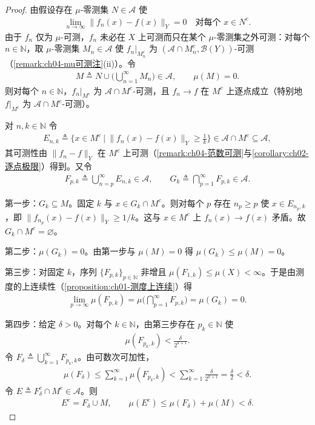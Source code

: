 \documentclass[../../main.tex]{subfiles}%
\begin{document}
\begin{proof}
由假设存在 $\mu$-零测集 $N\in\mathcal{A}$ 使
\begin{align*}
\lim_{n\to\infty}\|f_n(x)-f(x)\|_Y=0\quad\text{对每个 }x\in N^c.
\end{align*}
由于 $f_n$ 仅为 $\mu$-可测，$f_n$ 未必在 $X$ 上可测而只在某个 $\mu$-零测集之外可测：对每个 $n\in\mathbb{N}$，取 $\mu$-零测集 $M_n\in\mathcal{A}$ 使 $f_n|_{M_n^c}$ 为 $(\mathcal{A}\cap M_n^c,\mathcal{B}(Y))$-可测（\cref{remark:ch04-mu可测注}(ii)）。令
\begin{align*}
M\triangleq N\cup\Big(\bigcup_{n=1}^\infty M_n\Big)\in\mathcal{A},\qquad \mu(M)=0.
\end{align*}
则对每个 $n\in\mathbb{N}$，$f_n|_{M^c}$ 为 $\mathcal{A}\cap M^c$-可测，且 $f_n\to f$ 在 $M^c$ 上逐点成立（特别地 $f|_{M^c}$ 为 $\mathcal{A}\cap M^c$-可测）。

对 $n,k\in\mathbb{N}$ 令
\begin{align*}
E_{n,k}\triangleq \Big\{x\in M^c\ \Big|\ \|f_n(x)-f(x)\|_Y\geqslant\frac1k\Big\}\in\mathcal{A}\cap M^c\subseteq\mathcal{A},
\end{align*}
其可测性由 $\|f_n-f\|_Y$ 在 $M^c$ 上可测（\cref{remark:ch04-范数可测}与\cref{corollary:ch02-逐点极限}）得到。又令
\begin{align*}
F_{p,k}\triangleq \bigcup_{n=p}^\infty E_{n,k}\in\mathcal{A},\qquad G_k\triangleq\bigcap_{p=1}^\infty F_{p,k}\in\mathcal{A}.
\end{align*}

第一步：$G_k\subseteq M$。固定 $k$ 与 $x\in G_k\cap M^c$。则对每个 $p$ 存在 $n_p\geqslant p$ 使 $x\in E_{n_p,k}$，即 $\|f_{n_p}(x)-f(x)\|_Y\geqslant1/k$。这与 $x\in M^c$ 上 $f_n(x)\to f(x)$ 矛盾。故 $G_k\cap M^c=\varnothing$。

第二步：$\mu(G_k)=0$。由第一步与 $\mu(M)=0$ 得 $\mu(G_k)\leqslant\mu(M)=0$。

第三步：对固定 $k$，序列 $\{F_{p,k}\}_{p\in\mathbb{N}}$ 非增且 $\mu(F_{1,k})\leqslant\mu(X)<\infty$。于是由测度的上连续性（\cref{proposition:ch01-测度上连续}）得
\begin{align*}
\lim_{p\to\infty}\mu(F_{p,k})=\mu\Big(\bigcap_{p=1}^\infty F_{p,k}\Big)=\mu(G_k)=0.
\end{align*}

第四步：给定 $\delta>0$。对每个 $k\in\mathbb{N}$，由第三步存在 $p_k\in\mathbb{N}$ 使
\begin{align*}
\mu(F_{p_k,k})<\frac{\delta}{2^{k+1}}.
\end{align*}
令 $F_\delta\triangleq\bigcup_{k=1}^\infty F_{p_k,k}$。由可数次可加性，
\begin{align*}
\mu(F_\delta)\leqslant\sum_{k=1}^\infty\mu(F_{p_k,k})<\sum_{k=1}^\infty\frac{\delta}{2^{k+1}}=\frac{\delta}{2}<\delta.
\end{align*}
令 $E\triangleq F_\delta^c\cap M^c\in\mathcal{A}$。则
\begin{align*}
E^c=F_\delta\cup M,\qquad \mu(E^c)\leqslant\mu(F_\delta)+\mu(M)<\delta.
\end{align*}


\end{proof}
\end{document}
